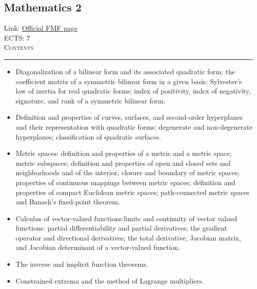\documentclass[11pt, a4paper]{article}
\newenvironment{course}[3]{
\subsection{#1}%
Link: \href{#2}{Official FMF page}\\%
ECTS: #3%
\vspace{1ex}
\\
{\large \textsc{Contents}}\\[-0.9ex]%
\rule{\textwidth}{0.5pt}
\vspace{-3ex}
}
{}
\newenvironment{chapter}[1]{
\begin{tcolorbox}[title=#1, breakable]
}
{\end{tcolorbox}}
\begin{document}
\begin{course}{Mathematics 2}{https://www.fmf.uni-lj.si/en/study-physics/programmes/1fiz/2020/7000777/courses/521/}{7}
\begin{chapter}{Quadratic forms}
\begin{itemize}
            \item Diagonalization of a bilinear form and its associated quadratic form; the coefficient matrix of a symmetric bilinear form in a given basis; Sylvester's law of inertia for real quadratic forms; index of positivity, index of negativity, signature, and rank of a symmetric bilinear form.

            \item Definition and properties of curves, surfaces, and second-order hyperplanes and their representation with quadratic forms; degenerate and non-degenerate hyperplanes; classification of quadratic surfaces.
        
        \end{itemize}
    \end{chapter}
 
    \begin{chapter}{Vector functions of several variables}
        \begin{itemize}
        
            \item Metric spaces: definition and properties of a metric and a metric space; metric subspaces; definition and properties of open and closed sets and neighborhoods and of the interior, closure and boundary of metric spaces; properties of continuous mappings between metric spaces; definition and properties of compact Euclidean metric spaces; path-connected metric spaces and Banach's fixed-point theorem.

            \item Calculus of vector-valued functions:limits and continuity of vector valued functions: 
            partial differentiability and partial derivatives; the gradient operator and directional derivatives;
            the total derivative, Jacobian matrix, and Jacobian determinant of a vector-valued function.

            \item The inverse and implicit function theorems.

            \item Constrained extrema and the method of Lagrange multipliers.

        \end{itemize}
    \end{chapter}
\end{course}
\end{document}
